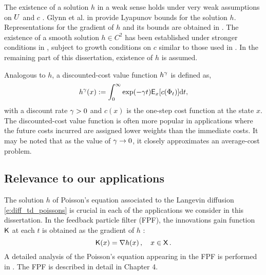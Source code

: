 The existence of a solution $h$ in a weak sense holds under very weak assumptions on $U$ and $c$  \cite{glymey96a,konmey12a}.  Glynn et al. in \cite{glymey96a} provide Lyapunov bounds for the solution $h$.  Representations for the gradient of $h$ and its bounds are obtained in \cite{laumehmeyrag15,devkonmey17b}.   The existence of  a  smooth solution $h\in C^2$ has been established under stronger conditions in \cite{parver01}, subject to growth conditions on $c$ similar to those used in  \cite{glymey96a}. In the remaining part of this dissertation, existence of $h$ is assumed. 

Analogous to $h$, a discounted-cost value function $h^\gamma$ is defined as,
\begin{equation}
h^\discount(x) := \int_0^\infty \exp(-\discount t )\Expect_x[c(\markovstate_t)] \ud t, 
\label{e:diff_td_discount_value_fn}
\end{equation}
with a discount rate $\gamma  >0$ and $c(x)$ is the one-step cost function at the state $x$. The discounted-cost value function is often more popular in applications where the future costs incurred are assigned lower weights than the immediate costs. It may be noted that as the value of $\gamma \to 0$, it closely approximates an average-cost problem. 

\subsection{Relevance to our applications} 
The solution $h$ of Poisson's equation associated to the Langevin diffusion \eqref{e:diff_td_poissons} is crucial in each of the applications we consider in this dissertation. In the feedback particle filter (FPF), the innovations gain function $\text{\sf K}$ at each $t$ is obtained as  the gradient of $h$ \cite{yanmehmey13}:
\begin{equation}
\kFPF (x) = \nabla h(x)\, ,  \quad x\in\state\, .
\label{e:diff_td_fpfgain}
\end{equation}
A detailed analysis of the Poisson's equation appearing in the FPF is performed in \cite{laumehmeyrag15}. The FPF is described in detail in Chapter 4. %

